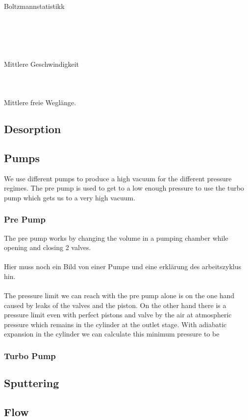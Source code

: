 \documentclass[]{article}
\begin{document}
 Boltzmannstatistikk \\\\\\\\\\\\
Mittlere Geschwindigkeit
\\\\\\\\
Mittlere freie Weglänge.


\subsection{Desorption}
\subsection{Pumps}
We use different pumps to produce a high vacuum for the different pressure regimes. The pre pump is used to get to a low enough pressure to use the turbo pump which gets us to a very high vacuum.
\subsubsection{Pre Pump}
The pre pump works by changing the volume in a pumping chamber while opening and closing 2 valves.
\\\\
Hier muss noch ein Bild von einer Pumpe und eine erklärung des arbeitszyklus hin.
\\\\
The pressure limit we can reach with the pre pump alone is on the one hand caused by leaks of the valves and the piston. On the other hand there is a pressure limit even with perfect pistons and valve by the air at atmospheric pressure which remains in the cylinder at the outlet stage. With adiabatic expansion in the cylinder we can calculate this minimum pressure to be
\[  \]
\subsubsection{Turbo Pump}
\subsection{Sputtering}

\subsection{Flow}
\end{document}
